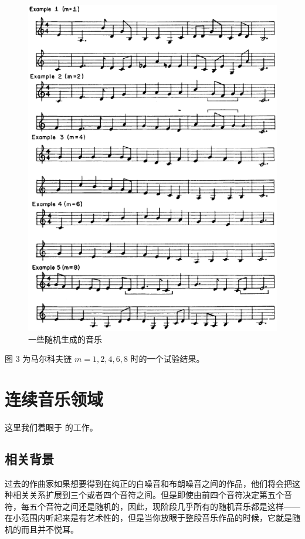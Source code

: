 \documentclass[11pt]{article}
\begin{document}
\begin{figure}[hptb]
	\centering
	\label{fig:1.1.3}
	\includegraphics[width=\textwidth]{pic/1.1.3.eps}
	\caption{一些随机生成的音乐}
\end{figure}
图 3 为马尔科夫链 $m=1,2,4,6,8$ 时的一个试验结果。

\section{连续音乐领域}
这里我们着眼于 \cite{10.2307/24955701} 的工作。
\subsection{相关背景}
过去的作曲家如果想要得到在纯正的白噪音和布朗噪音之间的作品，他们将会把这种相关关系扩展到三个或者四个音符之间。但是即使由前四个音符决定第五个音符，每五个音符之间还是随机的，因此，现阶段几乎所有的随机音乐都是这样——在小范围内听起来是有艺术性的，但是当你放眼于整段音乐作品的时候，它就是随机的而且并不悦耳。
\end{document}
